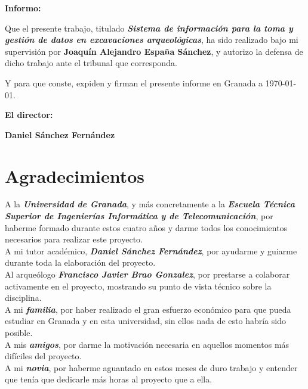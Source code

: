 \vspace{0.5cm}

\textbf{Informo:}

\vspace{0.5cm}

Que el presente trabajo, titulado \textit{\textbf{Sistema de información para la toma y
gestión de datos en excavaciones arqueológicas}}, ha sido realizado bajo mi supervisión por
\textbf{Joaquín Alejandro España Sánchez}, y autorizo la defensa de dicho trabajo ante el
tribunal que corresponda.

\vspace{0.5cm}

Y para que conste, expiden y firman el presente informe en Granada a \today.

\vspace{1cm}

\textbf{El director:}

\vspace{5cm}

\noindent \textbf{Daniel Sánchez Fernández}

\chapter*{Agradecimientos}

A la \textbf{\textit{Universidad de Granada}}, y más concretamente a la \textbf{\textit{Escuela
Técnica Superior de Ingenierías Informática y de Telecomunicación}}, por haberme formado
durante estos cuatro años y darme todos los conocimientos necesarios para realizar este
proyecto. \\

A mi tutor académico, \textbf{\textit{Daniel Sánchez Fernández}}, por ayudarme y guiarme durante
toda la elaboración del proyecto. \\

Al arqueólogo \textbf{\textit{Francisco Javier Brao Gonzalez}}, por prestarse a colaborar
activamente en el proyecto, mostrando su punto de vista técnico sobre la disciplina. \\

A mi \textbf{\textit{familia}}, por haber realizado el gran esfuerzo económico para que pueda
estudiar en Granada y en esta universidad, sin ellos nada de esto habría sido posible. \\

A mis \textbf{\textit{amigos}}, por darme la motivación necesaria en aquellos momentos más
difíciles del proyecto. \\

A mi \textbf{\textit{novia}}, por haberme aguantado en estos meses de duro trabajo y entender
que tenía que dedicarle más horas al proyecto que a ella. \\
